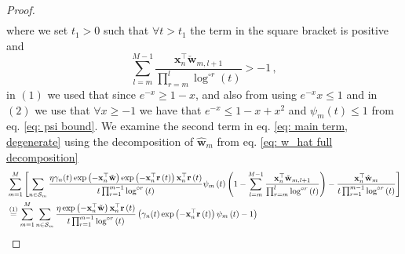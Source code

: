 \documentclass[twoside,11pt,english]{article}
\begin{document}
\begin{proof}
{\begin{align}
\end{align}}
where we set $t_{1}>0$
such that $\forall t>t_{1}$ the term in the square bracket is positive and \[ \sum_{l=m}^{M-1}\frac{\mathbf{x}_{n}^{\top}\check{\mathbf{w}}_{m,l+1}}{\prod_{r=m}^{l}\log^{\circ r}\left(t\right)}>-1 \, ,\] in $\left(1\right)$ we used that since $e^{-x}\geq1-x$, and also from using $e^{-x}x\leq1$ and in $\left(2\right)$
we use that $\forall x\geq -1$ we have that $e^{-x}\le 1-x+x^{2}$ and $\psi_{m}\left(t\right)\le 1$ from eq. \ref{eq: psi bound}.
\newpage
We examine the second term in eq. \ref{eq: main term, degenerate} using the decomposition of $\hat{\mathbf{w}}_{m}$ from eq. \ref{eq: w_hat full decomposition}  {\small
\begin{align}
&\sum_{m=1}^{M}\left[\sum_{n\in\set_{m}}\frac{\eta\gamma_n(t)\exp\left(-\mathbf{x}_{n}^{\top}\wtilde\right)\exp\left(-\mathbf{x}_{n}^{\top}\mathbf{r}\left(t\right)\right)\mathbf{x}_{n}^{\top}\mathbf{r}\left(t\right)}{t\prod_{r=1}^{m-1}\log^{\circ r}\left(t\right)}\psi_{m}\left(t\right)\left(1-\sum_{l=m}^{M-1}\frac{\mathbf{x}_{n}^{\top}\check{\mathbf{w}}_{m,l+1}}{\prod_{r=m}^{l}\log^{\circ r}\left(t\right)}\right)-\frac{\mathbf{x}_{n}^{\top}\hat{\mathbf{w}}_{m}}{t\prod_{r=1}^{m-1}\log^{\circ r}\left(t\right)}\right]\nonumber \\
&\overset{(1)}= %
\sum_{m=1}^{M}\sum_{n\in\set_{m}}\frac{\eta\exp\left(-\mathbf{x}_{n}^{\top}\wtilde\right)\mathbf{x}_{n}^{\top}\mathbf{r}\left(t\right)}{t\prod_{r=1}^{m-1}\log^{\circ r}\left(t\right)}\left(\gamma_n(t)\exp\left(-\mathbf{x}_{n}^{\top}\mathbf{r}\left(t\right)\right)
\psi_{m}\left(t\right)-1\right)\nonumber\\

\end{align}}
\end{proof}
\end{document}
